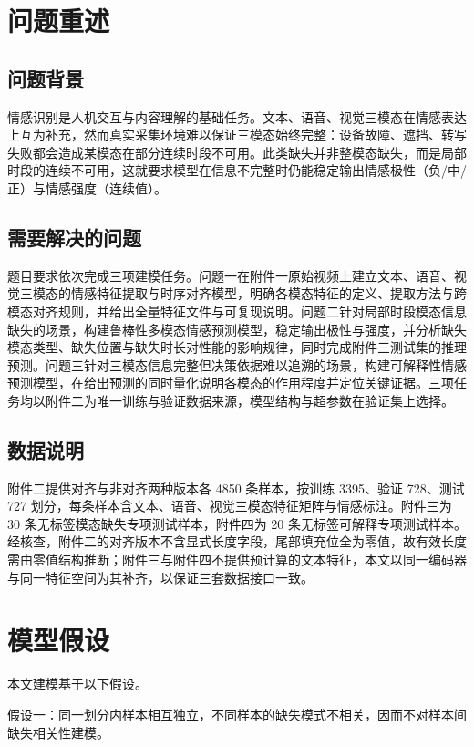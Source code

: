 \documentclass[withoutpreface,bwprint]{cumcmthesis}
\begin{document}
\section{问题重述}
\subsection{问题背景}
情感识别是人机交互与内容理解的基础任务。文本、语音、视觉三模态在情感表达上互为补充，然而真实采集环境难以保证三模态始终完整：设备故障、遮挡、转写失败都会造成某模态在部分连续时段不可用。此类缺失并非整模态缺失，而是局部时段的连续不可用，这就要求模型在信息不完整时仍能稳定输出情感极性（负/中/正）与情感强度（连续值）。

\subsection{需要解决的问题}
题目要求依次完成三项建模任务。问题一在附件一原始视频上建立文本、语音、视觉三模态的情感特征提取与时序对齐模型，明确各模态特征的定义、提取方法与跨模态对齐规则，并给出全量特征文件与可复现说明。问题二针对局部时段模态信息缺失的场景，构建鲁棒性多模态情感预测模型，稳定输出极性与强度，并分析缺失模态类型、缺失位置与缺失时长对性能的影响规律，同时完成附件三测试集的推理预测。问题三针对三模态信息完整但决策依据难以追溯的场景，构建可解释性情感预测模型，在给出预测的同时量化说明各模态的作用程度并定位关键证据。三项任务均以附件二为唯一训练与验证数据来源，模型结构与超参数在验证集上选择。

\subsection{数据说明}
附件二提供对齐与非对齐两种版本各 4850 条样本，按训练 3395、验证 728、测试 727 划分，每条样本含文本、语音、视觉三模态特征矩阵与情感标注。附件三为 30 条无标签模态缺失专项测试样本，附件四为 20 条无标签可解释专项测试样本。经核查，附件二的对齐版本不含显式长度字段，尾部填充位全为零值，故有效长度需由零值结构推断；附件三与附件四不提供预计算的文本特征，本文以同一编码器与同一特征空间为其补齐，以保证三套数据接口一致。

\section{模型假设}
本文建模基于以下假设。

假设一：同一划分内样本相互独立，不同样本的缺失模式不相关，因而不对样本间缺失相关性建模。
\end{document}
